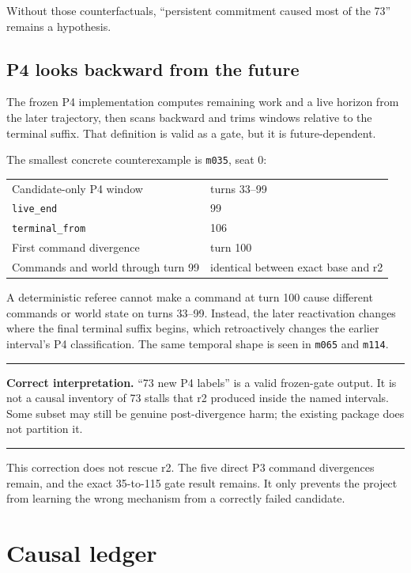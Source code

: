 \documentclass[10pt,a4paper]{article}
\newcommand{\code}[1]{\texttt{#1}}
\newenvironment{AmberBox}
  {\par\medskip\noindent\begin{minipage}{\textwidth}\color{warn}\hrule height 1.1pt\vspace{5pt}\color{ink}}
  {\vspace{2pt}\color{warn}\hrule height 1.1pt\end{minipage}\par\medskip}
\begin{document}
Without those counterfactuals, ``persistent commitment caused most of the 73'' remains a hypothesis.

\subsection{P4 looks backward from the future}

The frozen P4 implementation computes remaining work and a live horizon from the later trajectory,
then scans backward and trims windows relative to the terminal suffix. That definition is valid as
a gate, but it is future-dependent.

The smallest concrete counterexample is \code{m035}, seat 0:

\begin{tabularx}{\textwidth}{@{}p{42mm}Y@{}}
\toprule
Candidate-only P4 window & turns 33--99 \\
\code{live\_end} & 99 \\
\code{terminal\_from} & 106 \\
First command divergence & turn 100 \\
Commands and world through turn 99 & identical between exact base and r2 \\
\bottomrule
\end{tabularx}

A deterministic referee cannot make a command at turn 100 cause different commands or world state
on turns 33--99. Instead, the later reactivation changes where the final terminal suffix begins,
which retroactively changes the earlier interval's P4 classification. The same temporal shape is
seen in \code{m065} and \code{m114}.

\begin{AmberBox}
\textbf{Correct interpretation.} ``73 new P4 labels'' is a valid frozen-gate output. It is not a
causal inventory of 73 stalls that r2 produced inside the named intervals. Some subset may still
be genuine post-divergence harm; the existing package does not partition it.
\end{AmberBox}

This correction does not rescue r2. The five direct P3 command divergences remain, and the exact
35-to-115 gate result remains. It only prevents the project from learning the wrong mechanism from
a correctly failed candidate.

\section{Causal ledger}
\end{document}
